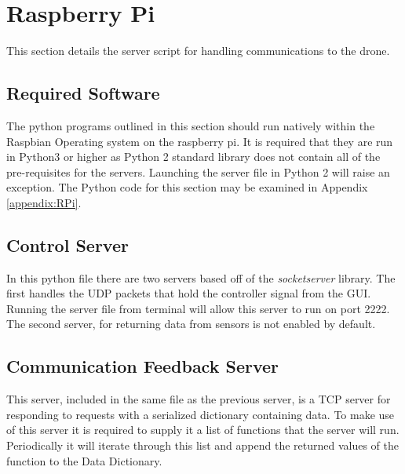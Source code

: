 \section{Raspberry Pi}
This section details the server script for handling communications to the drone.

\subsection{Required Software}
The python programs outlined in this section should run natively within the Raspbian Operating system on the raspberry pi.  It is required that they are run in Python3 or higher as Python 2 standard library does not contain all of the pre-requisites for the servers.  Launching the server file in Python 2 will raise an exception.  The Python code for this section may be examined in Appendix \ref{appendix:RPi}.

\subsection{Control Server}
In this python file there are two servers based off of the \textit{socketserver} library.  The first handles the UDP packets that hold the controller signal from the GUI.  Running the server file from terminal will allow this server to run on port 2222.  The second server, for returning data from sensors is not enabled by default.

\subsection{Communication Feedback Server}
This server, included in the same file as the previous server, is a TCP server for responding to requests with a serialized dictionary containing data.  To make use of this server it is required to supply it a list of functions that the server will run.  Periodically it will iterate through this list and append the returned values of the function to the Data Dictionary.